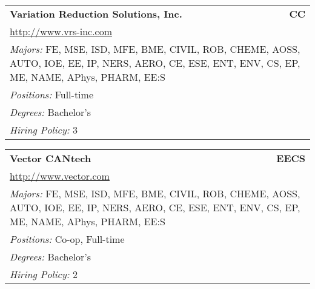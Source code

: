 \documentclass[twoside]{article}
\begin{document}
\begin{center}
\begin{multicols}{3}
\begin{FlushLeft}
\begin{minipage}{.9\columnwidth}\begin{tabularx}{.95\columnwidth}{Xr}
                 {\Large\bf Variation Reduction Solutions, Inc.} & {\Large\bf CC}\\
    \multicolumn{2}{p{.95\columnwidth}}{\url{http://www.vrs-inc.com}}\\
    \multicolumn{2}{p{.95\columnwidth}}{\emph{Majors:} FE, MSE, ISD, MFE, BME, CIVIL, ROB, CHEME, AOSS, AUTO, IOE, EE, IP, NERS, AERO, CE, ESE, ENT, ENV, CS, EP, ME, NAME, APhys, PHARM, EE:S}\\
    \multicolumn{2}{p{.95\columnwidth}}{\emph{Positions:} Full-time}\\
    \multicolumn{2}{p{.95\columnwidth}}{\emph{Degrees:} Bachelor's}\\
    \multicolumn{2}{p{.95\columnwidth}}{\emph{Hiring Policy:} 3}\\
    \end{tabularx}
    
\end{minipage}
 
\begin{minipage}{.9\columnwidth}\begin{tabularx}{.95\columnwidth}{Xr}
                 {\Large\bf Vector CANtech} & {\Large\bf EECS}\\
    \multicolumn{2}{p{.95\columnwidth}}{\url{http://www.vector.com}}\\
    \multicolumn{2}{p{.95\columnwidth}}{\emph{Majors:} FE, MSE, ISD, MFE, BME, CIVIL, ROB, CHEME, AOSS, AUTO, IOE, EE, IP, NERS, AERO, CE, ESE, ENT, ENV, CS, EP, ME, NAME, APhys, PHARM, EE:S}\\
    \multicolumn{2}{p{.95\columnwidth}}{\emph{Positions:} Co-op, Full-time}\\
    \multicolumn{2}{p{.95\columnwidth}}{\emph{Degrees:} Bachelor's}\\
    \multicolumn{2}{p{.95\columnwidth}}{\emph{Hiring Policy:} 2}\\
    \end{tabularx}
    
\end{minipage}
 

\end{FlushLeft}
\end{multicols}
\end{center}
\end{document}
